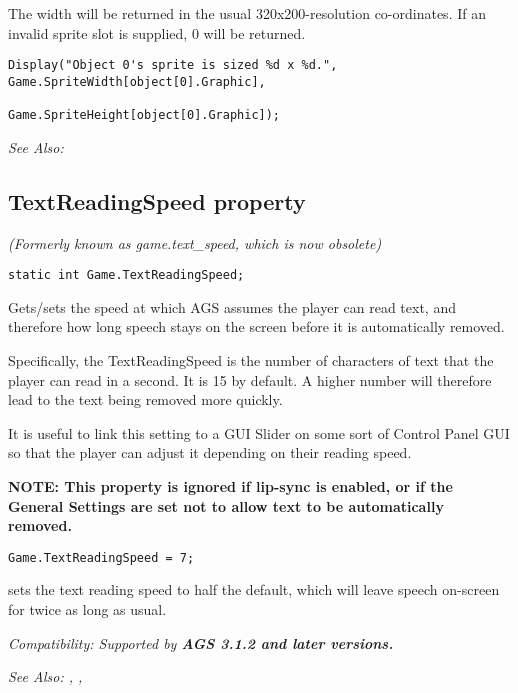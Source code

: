 The width will be returned in the usual 320x200-resolution co-ordinates. If an invalid
sprite slot is supplied, 0 will be returned.

\begin{verbatim}
Display("Object 0's sprite is sized %d x %d.", Game.SpriteWidth[object[0].Graphic],
                                               Game.SpriteHeight[object[0].Graphic]);
\end{verbatim}

\it{See Also:} 


\subsection{TextReadingSpeed property}\label{Game.TextReadingSpeed}%

\it{(Formerly known as game.text_speed, which is now obsolete)}

\begin{verbatim}
static int Game.TextReadingSpeed;
\end{verbatim}
Gets/sets the speed at which AGS assumes the player can read text, and therefore how
long speech stays on the screen before it is automatically removed.

Specifically, the TextReadingSpeed is the number of characters of text that the player
can read in a second. It is 15 by default. A higher number will therefore lead to the
text being removed more quickly.

It is useful to link this setting to a GUI Slider on some sort of Control Panel GUI
so that the player can adjust it depending on their reading speed.

\bf{NOTE:} This property is ignored if lip-sync is enabled, or if the General Settings
are set not to allow text to be automatically removed.

\begin{verbatim}
Game.TextReadingSpeed = 7;
\end{verbatim}
sets the text reading speed to half the default, which will leave speech on-screen
for twice as long as usual.

\it{Compatibility:} Supported by \bf{AGS 3.1.2} and later versions.

\it{See Also:} ,
,


